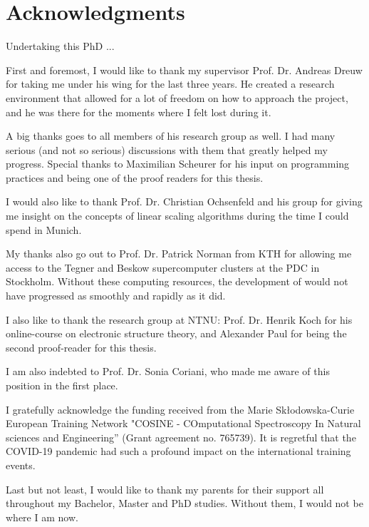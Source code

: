 \chapter*{Acknowledgments}

Undertaking this PhD ...

First and foremost, I would like to thank my supervisor Prof. Dr. Andreas Dreuw for taking me under his wing for the last three years. He created a research environment that allowed for a lot of freedom on how to approach the project, and he was there for the moments where I felt lost during it.

A big thanks goes to all members of his research group as well. I had many serious (and not so serious) discussions with them that greatly helped my progress. Special thanks to Maximilian Scheurer for his input on programming practices and being one of the proof readers for this thesis.

I would also like to thank Prof. Dr. Christian Ochsenfeld and his group for giving me insight on the concepts of linear scaling algorithms during the time I could spend in Munich.

My thanks also go out to Prof. Dr. Patrick Norman from KTH for allowing me access to the Tegner and Beskow supercomputer clusters at the PDC in Stockholm. Without these computing resources, the development of \mchem{} would not have progressed as smoothly and rapidly as it did. 

I also like to thank the research group at NTNU: Prof. Dr. Henrik Koch for his online-course on electronic structure theory, and Alexander Paul for being the second proof-reader for this thesis. 

I am also indebted to Prof. Dr. Sonia Coriani, who made me aware of this position in the first place.   

I gratefully acknowledge the funding received from the Marie Skłodowska-Curie European Training Network "COSINE - COmputational Spectroscopy In Natural sciences and Engineering” (Grant agreement no. 765739). It is regretful that the COVID-19 pandemic had such a profound impact on the international training events.

Last but not least, I would like to thank my parents for their support all throughout my Bachelor, Master and PhD studies. Without them, I would not be where I am now. 